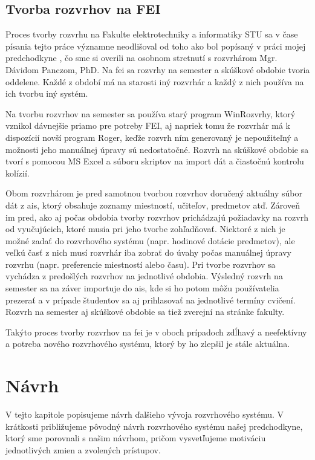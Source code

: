 \subsection{Tvorba rozvrhov na FEI}
\label{subsec:fei_timetabling}

Proces tvorby rozvrhu na Fakulte elektrotechniky a informatiky STU sa v čase
písania tejto práce významne neodlišoval od toho ako bol popísaný v práci mojej
predchodkyne \cite{knap}, čo sme si overili na osobnom stretnutí s rozvrhárom
Mgr. Dávidom Panczom, PhD. Na \acrshort{fei} sa rozvrhy na semester a skúškové
obdobie tvoria oddelene. Každé z období má na starosti iný rozvrhár a každý z
nich používa na ich tvorbu iný systém.

Na tvorbu rozvrhov na semester sa používa starý program WinRozvrhy, ktorý
vznikol dávnejšie priamo pre potreby FEI, aj napriek tomu že rozvrhár má k
dispozícií novší program Roger, keďže rozvrh ním generovaný je nepoužiteľný a
možnosti jeho manuálnej úpravy sú nedostatočné. Rozvrh na skúškové obdobie sa
tvorí s pomocou MS Excel a súboru skriptov na import dát a čiastočnú kontrolu
kolízií.

Obom rozvrhárom je pred samotnou tvorbou rozvrhov doručený aktuálny súbor dát z
\acrshort{ais}, ktorý obsahuje zoznamy miestností, učiteľov, predmetov atď.
Zároveň im pred, ako aj počas obdobia tvorby rozvrhov prichádzajú požiadavky na
rozvrh od vyučujúcich, ktoré musia pri jeho tvorbe zohľadňovať. Niektoré z nich
je možné zadať do rozvrhového systému (napr. hodinové dotácie predmetov), ale
veľkú časť z nich musí rozvrhár iba zobrať do úvahy počas manuálnej úpravy
rozvrhu (napr. preferencie miestností alebo času). Pri tvorbe rozvrhov sa
vychádza z predošlých rozvrhov na jednotlivé obdobia. Výsledný rozvrh na
semester sa na záver importuje do \acrshort{ais}, kde si ho potom môžu
používatelia prezerať a v prípade študentov sa aj prihlasovať na jednotlivé
termíny cvičení. Rozvrh na semester aj skúškové obdobie sa tiež zverejní na
stránke fakulty.

Takýto proces tvorby rozvrhov na \acrshort{fei} je v oboch prípadoch zdĺhavý a
neefektívny a potreba nového rozvrhového systému, ktorý by ho zlepšil je stále
aktuálna.

\section{Návrh}
\label{sec:design}

V tejto kapitole popisujeme návrh ďalšieho vývoja rozvrhového systému. V
krátkosti približujeme pôvodný návrh rozvrhového systému našej predchodkyne,
ktorý sme porovnali s našim návrhom, pričom vysvetľujeme motiváciu jednotlivých
zmien a zvolených prístupov.

